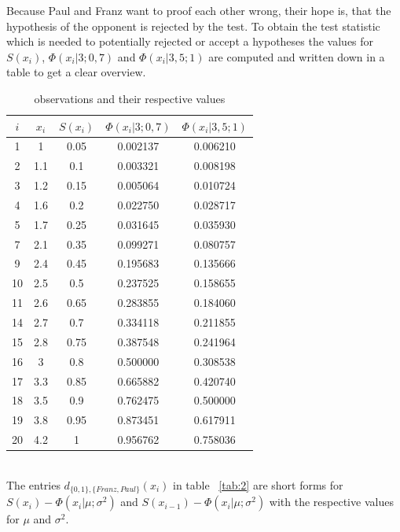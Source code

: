 \documentclass{article}
\theoremstyle{definition}
\begin{document}
Because Paul and Franz want to proof each other wrong, their hope is, that the hypothesis of the opponent is rejected by the test.
To obtain the test statistic which is needed to potentially rejected or accept a hypotheses the values for $S(x_i)$, $\Phi (x_i|3;0,7)$ and $\Phi (x_i|3,5;1)$ are computed and written down in a table to get a clear overview.
\begin{table}[ht]
\caption{observations and their respective values}
\center
\begin{tabular}{c|c|c|c|c}
\label{tab:1}
$i$ 	& $x_i$ 	& $S(x_i)$ 	& $\Phi (x_i|3;0,7)$ 	& $\Phi (x_i|3,5;1)$ 	\\
\hline
1	&	1	&	0.05	&	0.002137	&	0.006210	\\
2	&	1.1	&	0.1	&	0.003321	&	0.008198	\\
3	&	1.2	&	0.15	&	0.005064	&	0.010724	\\
4	&	1.6	&	0.2	&	0.022750	&	0.028717	\\
5	&	1.7	&	0.25	&	0.031645	&	0.035930	\\
7	&	2.1	&	0.35	&	0.099271	&	0.080757	\\
9	&	2.4	&	0.45	&	0.195683	&	0.135666	\\
10	&	2.5	&	0.5	&	0.237525	&	0.158655	\\
11	&	2.6	&	0.65	&	0.283855	&	0.184060	\\
14	&	2.7	&	0.7	&	0.334118	&	0.211855	\\
15	&	2.8	&	0.75	&	0.387548	&	0.241964	\\
16	&	3	&	0.8	&	0.500000	&	0.308538	\\
17	&	3.3	&	0.85	&	0.665882	&	0.420740	\\
18	&	3.5	&	0.9	&	0.762475	&	0.500000	\\
19	&	3.8	&	0.95	&	0.873451	&	0.617911	\\
20	&	4.2	&	1	&	0.956762	&	0.758036	\\
\end{tabular}
\end{table}
\\
The entries $d_{\{0,1\},\{Franz,Paul\}}(x_i)$ in table ~\ref{tab:2} are short forms for $S(x_i)-\Phi (x_i|\mu ;\sigma^2)$ and $S(x_{i-1})-\Phi (x_i|\mu;\sigma^2)$ with the respective values for $\mu$ and $\sigma^2$.\\
\end{document}
